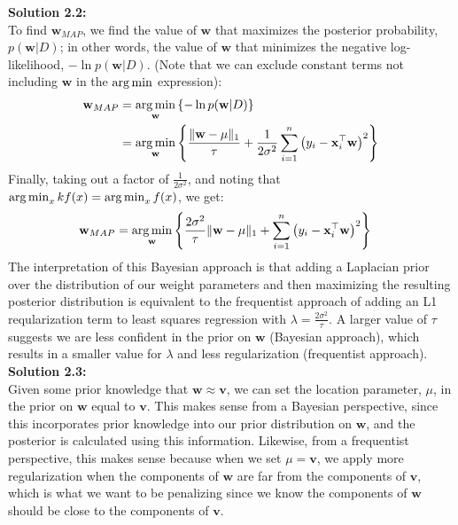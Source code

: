 \documentclass[submit]{harvardml}
\begin{document}
\noindent\textbf{Solution 2.2:}\\
To find $\mathbf{w}_{MAP}$, we find the value of $\mathbf{w}$ that maximizes the posterior probability, $p(\mathbf{w} | D)$; in other words, the value of $\mathbf{w}$ that minimizes the negative log-likelihood, $- \ln p(\mathbf{w} | D)$. (Note that we can exclude constant terms not including $\mathbf{w}$ in the $\argmin$ expression):
\begin{align*}
    \mathbf{w}_{MAP} &= \argmin_{\mathbf{w}} \left\{ - \ln p(\mathbf{w} | D)\right\}\\
    &= \argmin_{\mathbf{w}} \left\{ \frac{\|\mathbf{w}-\mathbf{\mu}\|_1}{\tau} +\frac{1}{2 \sigma^2} \sum_{i=1}^n \left(y_i- \mathbf{x}_i^\top \mathbf{w} \right)^{2}\right\}
\end{align*}
Finally, taking out a factor of $\frac{1}{2 \sigma^2}$, and noting that $\argmin_x kf(x) = \argmin_x f(x)$, we get:
\begin{align*}
    \mathbf{w}_{MAP} &= \argmin_{\mathbf{w}} \left\{\frac{2\sigma^2}{\tau} \|\mathbf{w}-\mathbf{\mu}\|_1 + \sum_{i=1}^n \left(y_i- \mathbf{x}_i^\top \mathbf{w} \right)^{2}\right\}
\end{align*}
The interpretation of this Bayesian approach is that adding a Laplacian prior over the distribution of our weight parameters and then maximizing the resulting posterior distribution is equivalent
to the frequentist approach of adding an L1 reqularization term to least squares regression with $\lambda = \frac{2 \sigma^2}{\tau}$. A larger value of $\tau$ suggests we are less confident in the prior on $\mathbf{w}$ (Bayesian approach), which results in a smaller value for $\lambda$ and less regularization (frequentist approach).\\

\noindent\textbf{Solution 2.3:}\\
Given some prior knowledge that $\mathbf{w} \approx \mathbf{v}$, we can set the location parameter, $\mu$, in the prior on $\mathbf{w}$ equal to $\mathbf{v}$. This makes sense from a Bayesian perspective, since this incorporates prior knowledge into our prior distribution on $\mathbf{w}$, and the posterior is calculated using this information. Likewise, from a frequentist perspective, this makes sense because when we set $\mu = \mathbf{v}$, we apply more regularization when the components of $\mathbf{w}$ are far from the components of $\mathbf{v}$, which is what we want to be penalizing since we know the components of $\mathbf{w}$ should be close to the components of $\mathbf{v}$.\\
\end{document}
